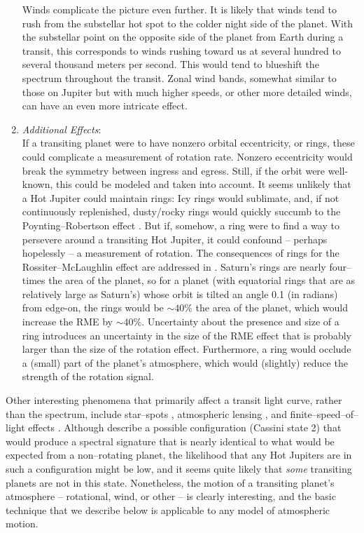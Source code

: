 \begin{enumerate}
Winds complicate the picture even further.  It is likely that winds
tend to rush from the substellar hot spot to the colder night side of
the planet.  With the substellar point on the opposite side of the
planet from Earth during a transit, this corresponds to winds rushing
toward us at several hundred to several thousand meters per second.
This would tend to blueshift the spectrum throughout the transit.
Zonal wind bands, somewhat similar to those on Jupiter but with much
higher speeds, or other more detailed winds, can have an even more
intricate effect.
\item {\it Additional Effects}:\\ If a transiting planet were to have
 nonzero orbital eccentricity, or rings, these could complicate a
 measurement of rotation rate.  Nonzero eccentricity would break the
 symmetry between ingress and egress.  Still, if the orbit were
 well-known, this could be modeled and taken into account.  It seems
 unlikely that a Hot Jupiter could maintain rings: Icy rings would
 sublimate, and, if not continuously replenished, dusty/rocky rings
 would quickly succumb to the Poynting--Robertson effect
 \citep{poynting1903,robertson1937}.  But if, somehow, a ring were to
 find a way to persevere around a transiting Hot Jupiter, it could
 confound -- perhaps hopelessly -- a measurement of rotation.  The
 consequences of rings for the Rossiter--McLaughlin effect are
 addressed in \citet{ohta_et_al2006}.  Saturn's rings are nearly
 four--times the area of the planet, so for a planet (with equatorial
 rings that are as relatively large as Saturn's) whose orbit is tilted
 an angle 0.1 (in radians) from edge-on, the rings would be $\sim
 40\%$ the area of the planet, which would increase the RME by $\sim
 40\%$.  Uncertainty about the presence and size of a ring introduces
 an uncertainty in the size of the RME effect that is probably larger
 than the size of the rotation effect.  Furthermore, a ring would
 occlude a (small) part of the planet's atmosphere, which would
 (slightly) reduce the strength of the rotation signal.
\end{enumerate}

Other interesting phenomena that primarily affect a transit light
curve, rather than the spectrum, include star--spots
\citep{silva2003}, atmospheric lensing \citep{hui+seager2002}, and
finite--speed--of--light effects \citep{loeb2005}.  Although
\citet{winn+holman2005} describe a possible configuration (Cassini
state 2) that would produce a spectral signature that is nearly
identical to what would be expected from a non--rotating planet, the
likelihood that any Hot Jupiters are in such a configuration might be
low, and it seems quite likely that {\it some} transiting planets are
not in this state.  Nonetheless, the motion of a transiting planet's
atmosphere -- rotational, wind, or other -- is clearly interesting,
and the basic technique that we describe below is applicable to any
model of atmospheric motion.

